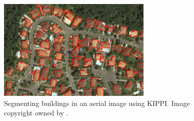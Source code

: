 \begin{figure}[!h]
	\centering
	\includegraphics[width=\figfig\textwidth]{2-10.png}
    \caption[Segmenting buildings in an aerial image using KIPPI]{Segmenting buildings in an aerial image using KIPPI. Image copyright owned by \cite{kippi}.}
    \label{fig:kippiarlimg}
\end{figure}